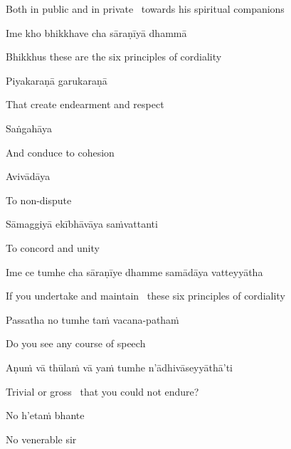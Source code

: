 \begin{english}
  Both in public and in private \breathmark\ towards his spiritual companions
\end{english}

Ime kho bhikkhave cha sāraṇīyā dhammā

\begin{english}
  Bhikkhus these are the six principles of cordiality
\end{english}

Piyakaraṇā garukaraṇā

\begin{english}
  That create endearment and respect
\end{english}

Saṅgahāya

\begin{english}
  And conduce to cohesion
\end{english}

Avivādāya

\begin{english}
  To non-dispute
\end{english}

Sāmaggiyā ekībhāvāya saṁvattanti

\begin{english}
  To concord and unity
\end{english}

\suttaRef{[MN 48]}

Ime ce tumhe cha sāraṇīye dhamme samādāya vatteyyātha

\begin{english}
  If you undertake and maintain \breathmark\ these six principles of cordiality
\end{english}

Passatha no tumhe taṁ vacana-pathaṁ

\begin{english}
  Do you see any course of speech
\end{english}

Aṇuṁ vā thūlaṁ vā yaṁ tumhe n'ādhivāseyyāthā'ti

\begin{english}
  Trivial or gross \breathmark\ that you could not endure?
\end{english}

No h'etaṁ bhante

\begin{english}
  No venerable sir
\end{english}

